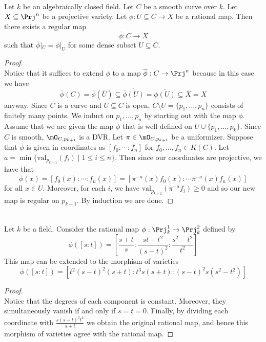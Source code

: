 \documentclass[a4paper]{article}
\begin{document}
\begin{prp}{}{}\\
Let $k$ be an algebraically closed field. Let $C$ be a smooth curve over $k$. Let $X\subseteq\Prj^n$ be a projective variety. Let $\phi:U\subseteq C\to X$ be a rational map. Then there exists a regular map $$\overline{\phi}:C\to X$$ such that $\overline{\phi}|_U=\phi|_U$ for some dense subset $U\subseteq C$. 
\begin{proof}\\
Notice that it suffices to extend $\phi$ to a map $\overline{\phi}:C\to\Prj^n$ because in this case we have $$\overline{\phi}(C)=\overline{\phi}(\overline{U})\subseteq\overline{\overline{\phi}(U)}=\overline{\phi(U)}\subseteq\overline{X}=X$$ anyway. Since $C$ is a curve and $U\subseteq C$ is open, $C\setminus U=\{p_1,\dots,p_n\}$ consists of finitely many points. We induct on $p_1,\dots,p_n$ by starting out with the map $\phi$. \\

Assume that we are given the map $\overline{\phi}$ that is well defined on $U\cup\{p_1,\dots,p_k\}$. Since $C$ is smooth, $\mO_{C,p_{k+1}}$ is a DVR. Let $\pi\in\mO_{C,p_{k+1}}$ be a uniformizer. Suppose that $\overline{\phi}$ is given in coordinates as $[f_0:\cdots:f_n]$ for $f_0,\dots,f_n\in K(C)$. Let $a=\min\{\text{val}_{p_{k+1}}(f_i)\;|\;1\leq i\leq n\}$. Then since our coordinates are projective, we have that $$\overline{\phi}(x)=[f_0(x):\cdots:f_n(x)]=[\pi^{-a}(x)f_0(x):\cdots\pi^{-a}(x)f_n(x)]$$ for all $x\in U$. Moreover, for each $i$, we have $\text{val}_{p_{k+1}}(\pi^{-a}f_i)\geq 0$ and so our new map is regular on $p_{k+1}$. By induction we are done. 
\end{proof}
\end{prp}

\begin{eg}{}{}\\
Let $k$ be a field. Consider the rational map $\phi:\Prj_k^1\to\Prj_k^2$ defined by $$\phi([s:t])=\left[\frac{s+t}{s}:\frac{st+t^2}{(s-t)^2}:\frac{s^2-t^2}{t^2}\right]$$ This map can be extended to the morphism of varieties $$\overline{\phi}([s:t])=[t^2(s-t)^2(s+t):t^3s(s+t):(s-t)^2s(s^2-t^2)]$$
\begin{proof}\\
Notice that the degrees of each component is constant. Moreover, they simultaneously vanish if and only if $s=t=0$. Finally, by dividing each coordinate with $\frac{s(s-t)^2t^2}{s+t}$ we obtain the original rational map, and hence this morphism of varieties agree with the rational map. 
\end{proof}
\end{eg}
\end{document}
